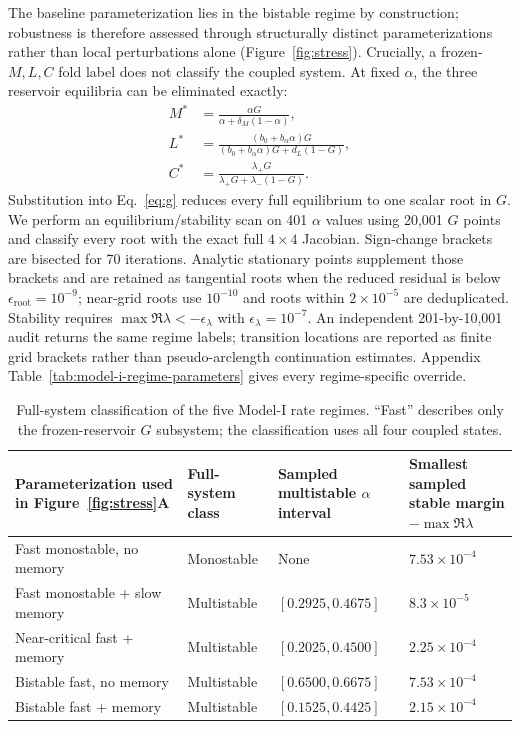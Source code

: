 \documentclass[pdflatex,sn-mathphys-num]{sn-jnl}
\begin{document}
The baseline parameterization lies in the bistable regime by construction; robustness is therefore assessed through structurally distinct parameterizations rather than local perturbations alone (Figure~\ref{fig:stress}). Crucially, a frozen-$M,L,C$ fold label does not classify the coupled system. At fixed $\alpha$, the three reservoir equilibria can be eliminated exactly:
\begin{equation}
\begin{aligned}
M^*&=\frac{\alpha G}{\alpha+\delta_M(1-\alpha)},\\
L^*&=\frac{(b_0+b_\alpha\alpha)G}{(b_0+b_\alpha\alpha)G+d_L(1-G)},\\
C^*&=\frac{\lambda_+G}{\lambda_+G+\lambda_-(1-G)}.
\end{aligned}
\label{eq:reservoir-equilibria}
\end{equation}
Substitution into Eq.~\eqref{eq:g} reduces every full equilibrium to one scalar root in $G$. We perform an equilibrium/stability scan on 401 $\alpha$ values using 20,001 $G$ points and classify every root with the exact full $4\times4$ Jacobian. Sign-change brackets are bisected for 70 iterations. Analytic stationary points supplement those brackets and are retained as tangential roots when the reduced residual is below $\epsilon_{\mathrm{root}}=10^{-9}$; near-grid roots use $10^{-10}$ and roots within $2\times10^{-5}$ are deduplicated. Stability requires $\max\Re\lambda<-\epsilon_\lambda$ with $\epsilon_\lambda=10^{-7}$. An independent 201-by-10,001 audit returns the same regime labels; transition locations are reported as finite grid brackets rather than pseudo-arclength continuation estimates. Appendix Table~\ref{tab:model-i-regime-parameters} gives every regime-specific override.

\begin{table}[!htbp]
\centering
\caption{Full-system classification of the five Model-I rate regimes. ``Fast'' describes only the frozen-reservoir $G$ subsystem; the classification uses all four coupled states.}
\label{tab:full-classification}
\small
\begin{tabularx}{\textwidth}{|p{3.7cm}|p{2.6cm}|p{2.8cm}|Y|}
\hline
\textbf{Parameterization used in Figure~\ref{fig:stress}A} & \textbf{Full-system class} & \textbf{Sampled multistable $\alpha$ interval} & \textbf{Smallest sampled stable margin $-\max\Re\lambda$}\\
\hline
Fast monostable, no memory & Monostable & None & $7.53\times10^{-4}$\\
\hline
Fast monostable + slow memory & Multistable & $[0.2925,0.4675]$ & $8.3\times10^{-5}$\\
\hline
Near-critical fast + memory & Multistable & $[0.2025,0.4500]$ & $2.25\times10^{-4}$\\
\hline
Bistable fast, no memory & Multistable & $[0.6500,0.6675]$ & $7.53\times10^{-4}$\\
\hline
Bistable fast + memory & Multistable & $[0.1525,0.4425]$ & $2.15\times10^{-4}$\\
\hline
\end{tabularx}
\end{table}
\end{document}
